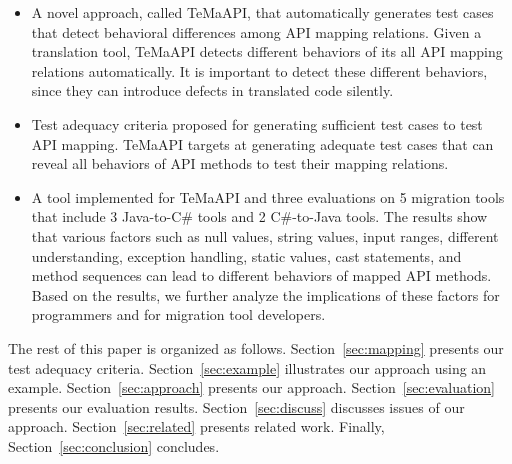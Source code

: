 \begin{itemize}\vspace*{-1.5ex}
\item A novel approach, called TeMaAPI, that automatically generates test cases that detect behavioral differences among API mapping relations. Given a translation tool, TeMaAPI detects different behaviors of its all API mapping relations automatically. It is important to detect these different behaviors, since they can introduce defects in translated code silently.\vspace*{-1.5ex}
\item Test adequacy criteria proposed for generating sufficient test cases to test API mapping. TeMaAPI targets at generating adequate test cases that can reveal all behaviors of API methods to test their mapping relations.\vspace*{-1.5ex}
\item A tool implemented for TeMaAPI and three evaluations on 5 migration tools that include 3 Java-to-C\# tools and 2 C\#-to-Java tools. The results show that various factors such as null values, string values, input ranges, different understanding, exception handling, static values, cast statements, and method sequences can lead to different behaviors of mapped API methods. Based on the results, we further analyze the implications of these factors for programmers and for migration tool developers.
\end{itemize}\vspace*{-1.5ex}

The rest of this paper is organized as follows.
Section~\ref{sec:mapping} presents our test adequacy criteria.
Section~\ref{sec:example} illustrates our approach using an example.
Section~\ref{sec:approach} presents our approach.
Section~\ref{sec:evaluation} presents our evaluation results.
Section~\ref{sec:discuss} discusses issues of our approach.
Section~\ref{sec:related} presents related work.
Finally, Section~\ref{sec:conclusion} concludes.



